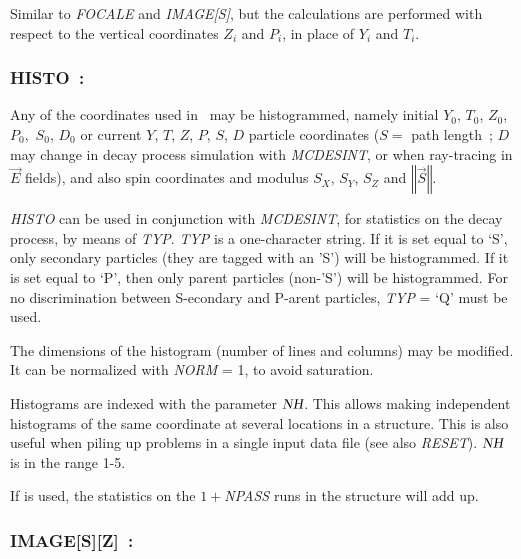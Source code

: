 Similar to \textsl{FOCALE} and \textsl{IMAGE[S]}, but the calculations are performed 
with respect to the vertical coordinates $ Z_i $ and $ P_i $, in place of $Y_i $ 
and $ T_i$. 
\vfill

\newpage

\subsubsection*{HISTO~: \HISTOTitl}\label{HISTO} 
\medskip

Any of the coordinates used in \zgou\ may be histogrammed,
namely initial  $ Y_0$,  $ T_0$,  $ Z_0$,  $ P_0, $ $ S_0 $, $ D_0 $  or current 
$ Y$, $T$, $Z$, $P$, $S$, $D$ particle coordinates ($ S=$ path length~;  
$ D $ may change  in decay process simulation with \textsl{MCDESINT}, 
or when ray-tracing in $ \vec  E $ fields), and also spin coordinates and
modulus $ S_X$, $ S_Y$,  $ S_Z $ and $ \left\Vert\vec  S \right\Vert   $.  
\medskip

\noindent\textsl{HISTO}  can be used in conjunction with 
\textsl{MCDESINT}, for statistics 
on the decay process, by means of \textsl{TYP}.  \textsl{TYP} is a one-character string.  
If it is set equal to `S', only secondary particles (they are tagged with an 'S') will be    
histogrammed.  If it is set equal to `P', then only  parent particles (non-'S') will be histogrammed.  
For no discrimination  between S-econdary and P-arent particles,  \textsl{TYP} = `Q'  must be
used.  
\medskip

\noindent The dimensions of the histogram (number of lines and columns) may be
modified. It can be normalized with \textsl{NORM} = 1, to avoid saturation.  
\medskip

\noindent Histograms are indexed with the parameter  $\textsl{NH}$.  This allows making
independent histograms of the same coordinate at several locations 
in a structure.  This is also useful when piling up problems in a single input data 
file  (see also \textsl{RESET}). $\textsl{NH}$ is in the range 1-5.  
\medskip

\noindent If \REBELOTE{} is used, the statistics on the $1+$\textsl{NPASS}
runs in the structure will add up. 



\newpage

\subsubsection*{IMAGE[S][Z]~: \IMAGESZTitl}
\medskip 

